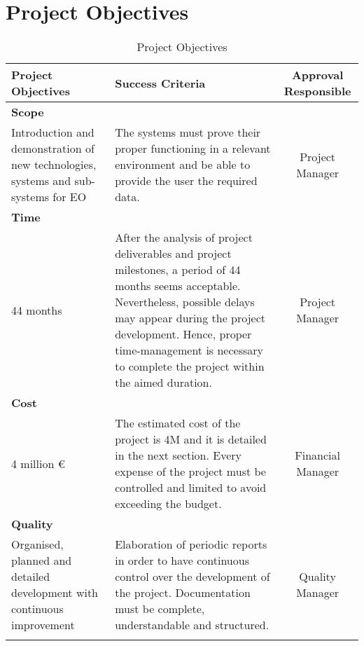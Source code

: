 \section{Project Objectives}

	\begin{longtable}{p{3.9cm} p{6.1cm} c}
		\toprule[2pt]
		\textbf{Project Objectives} & \textbf{Success Criteria} & \textbf{Approval Responsible} 
		\\ \midrule [1.5pt]
		\endhead
		
		\textbf{Scope} &  &  
		\\ \midrule

		Introduction and demonstration of new technologies, systems and sub-systems for EO & The systems must prove their proper functioning in a relevant environment and be able to provide the user the required data. & Project Manager \vspace{0.2cm}
		\\ \midrule
		
		\textbf{Time} &  &   
		\\ \midrule

		44 months & After the analysis of project deliverables and project milestones, a period of 44 months seems acceptable. Nevertheless, possible delays may appear during the project development. Hence, proper time-management is necessary to complete the project within the aimed duration. & Project Manager  \vspace{0.2cm}
		\\ \midrule

		\textbf{Cost} &  &   
		\\ \midrule

		4 million \euro & The estimated cost of the project is 4M  and it is detailed in the next section. Every expense of the project must be controlled and limited to avoid exceeding the budget. & Financial Manager  \vspace{0.2cm}
		\\ \midrule

		\textbf{Quality} &  &  
		\\ \midrule

		Organised, planned and detailed development with continuous improvement & 
 		Elaboration of periodic reports in order to have continuous control over the development of the project. \newline
 		Documentation must be complete, understandable and structured. & Quality Manager  \vspace{0.2cm}
 		\\	\bottomrule[2pt]

		\caption{Project Objectives}

	\end{longtable}

